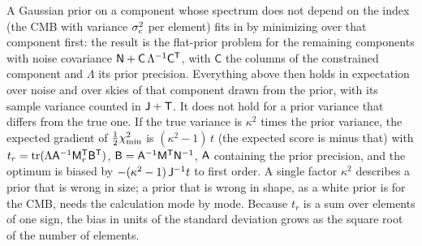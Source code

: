 A Gaussian prior on a component whose spectrum does not depend on the index (the CMB with variance
$\sigma_{\rm c}^2$ per element) fits in by minimizing over that component first: the result is the
flat-prior problem for the remaining components with noise covariance
$\mathsf{N} + \mathsf{C}\,\Lambda^{-1}\mathsf{C}^{\mathsf{T}}$, with $\mathsf{C}$ the columns of the constrained component and
$\Lambda$ its prior precision. Everything above then holds in expectation over noise and over skies
of that component drawn from the prior, with its sample variance counted in $\mathsf{J} + \mathsf{T}$. It does not
hold for a prior variance that differs from the true one. If the true variance is $\kappa^2$ times
the prior variance, the expected gradient of $\tfrac12\chi^2_{\min}$ is $(\kappa^2 - 1)\,t$ (the expected
score is minus that) with $t_r = \mathrm{tr}(\Lambda\mathsf{A}^{-1}\mathsf{M}_r^{\mathsf{T}}\mathsf{B}^{\mathsf{T}})$, $\mathsf{B} = \mathsf{A}^{-1}\mathsf{M}^{\mathsf{T}}\mathsf{N}^{-1}$,
$\mathsf{A}$ containing the prior precision, and the optimum is biased by $-(\kappa^2-1)\,\mathsf{J}^{-1}t$ to first
order. A single factor $\kappa^2$ describes a prior that is wrong in size; a prior that is wrong in
shape, as a white prior is for the CMB, needs the calculation mode by mode. Because $t_r$ is a sum over elements of one sign, the bias
in units of the standard deviation grows as the square root of the number of elements.

